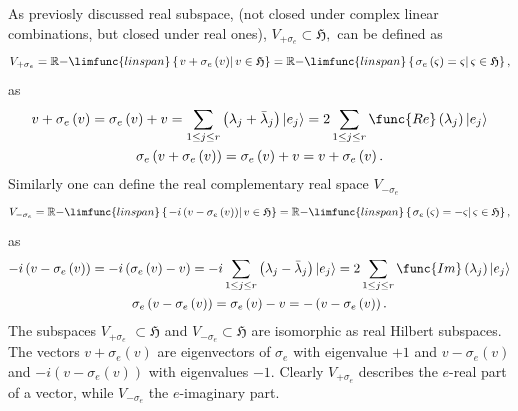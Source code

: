 \documentclass[aps,preprint]{revtex4}
\begin{document}
As previosly discussed real subspace, (not closed under complex linear
combinations, but closed under real ones), $V_{+\sigma _{e}}\subset 
\mathfrak{H,}$ can be defined as 
\begin{equation}
V_{+\sigma _{e}}=\mathbb{R-}\limfunc{linspan}\left\{ \left. v+\sigma
_{e}\left( v\right) \right\vert v\in \mathfrak{H}\right\} =\mathbb{R-}%
\limfunc{linspan}\left\{ \left. \sigma _{e}\left( \varsigma \right)
=\varsigma \right\vert \varsigma \in \mathfrak{H}\right\} ,
\end{equation}%
as%
\begin{gather}
v+\sigma _{e}\left( v\right) =\sigma _{e}\left( v\right) +v=\sum_{1\leq
j\leq r}\left( \lambda _{j}+\bar{\lambda}_{j}\right) \left\vert
e_{j}\right\rangle =2\sum_{1\leq j\leq r}\func{Re}\left( \lambda _{j}\right)
\left\vert e_{j}\right\rangle \\
\sigma _{e}\left( v+\sigma _{e}\left( v\right) \right) =\sigma _{e}\left(
v\right) +v=v+\sigma _{e}\left( v\right) .
\end{gather}%
Similarly one can define the real complementary real space $V_{-\sigma _{e}}$
\begin{equation}
V_{-\sigma _{e}}=\mathbb{R-}\limfunc{linspan}\left\{ \left. -i\left(
v-\sigma _{e}\left( v\right) \right) \right\vert v\in \mathfrak{H}\right\} =%
\mathbb{R-}\limfunc{linspan}\left\{ \left. \sigma _{e}\left( \varsigma
\right) =-\varsigma \right\vert \varsigma \in \mathfrak{H}\right\} ,
\end{equation}%
as%
\begin{gather}
-i\left( v-\sigma _{e}\left( v\right) \right) =-i\left( \sigma _{e}\left(
v\right) -v\right) =-i\sum_{1\leq j\leq r}\left( \lambda _{j}-\bar{\lambda}%
_{j}\right) \left\vert e_{j}\right\rangle =2\sum_{1\leq j\leq r}\func{Im}%
\left( \lambda _{j}\right) \left\vert e_{j}\right\rangle \\
\sigma _{e}\left( v-\sigma _{e}\left( v\right) \right) =\sigma _{e}\left(
v\right) -v=-\left( v-\sigma _{e}\left( v\right) \right) .
\end{gather}%
The subspaces $V_{+\sigma _{e}}$ $\subset \mathfrak{H}$ and $V_{-\sigma
_{e}}\subset \mathfrak{H}$ are isomorphic as real Hilbert subspaces. The
vectors $v+\sigma _{e}\left( v\right) $ are eigenvectors of $\sigma _{e}$
with eigenvalue $+1$ and $v-\sigma _{e}\left( v\right) $ and $-i\left(
v-\sigma _{e}\left( v\right) \right) $ with eigenvalues $-1.$ Clearly $%
V_{+\sigma _{e}}$ describes the $e$-real part of a vector, while $V_{-\sigma
_{e}}$ the $e$-imaginary part.
\end{document}
